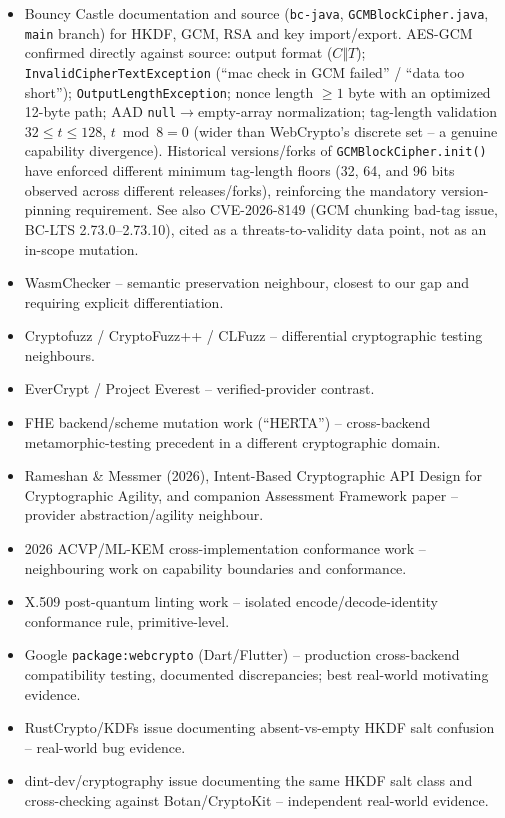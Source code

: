 \documentclass[11pt,a4paper]{article}
\begin{document}
\begin{itemize}
\item Bouncy Castle documentation and source (\texttt{bc-java}, \texttt{GCMBlockCipher.java}, \texttt{main} branch) for HKDF, GCM, RSA and key import/export. AES-GCM confirmed directly against source: output format ($C\Vert T$); \texttt{InvalidCipherTextException} (``mac check in GCM failed'' / ``data too short''); \texttt{OutputLengthException}; nonce length $\ge 1$ byte with an optimized 12-byte path; AAD \texttt{null}$\to$empty-array normalization; tag-length validation $32 \le t \le 128$, $t \bmod 8 = 0$ (wider than WebCrypto's discrete set -- a genuine capability divergence). Historical versions/forks of \texttt{GCMBlockCipher.init()} have enforced different minimum tag-length floors (32, 64, and 96 bits observed across different releases/forks), reinforcing the mandatory version-pinning requirement. See also CVE-2026-8149 (GCM chunking bad-tag issue, BC-LTS 2.73.0--2.73.10), cited as a threats-to-validity data point, not as an in-scope mutation.
\item WasmChecker -- semantic preservation neighbour, closest to our gap and requiring explicit differentiation.
\item Cryptofuzz / CryptoFuzz++ / CLFuzz -- differential cryptographic testing neighbours.
\item EverCrypt / Project Everest -- verified-provider contrast.
\item FHE backend/scheme mutation work (``HERTA'') -- cross-backend metamorphic-testing precedent in a different cryptographic domain.
\item Rameshan \& Messmer (2026), Intent-Based Cryptographic API Design for Cryptographic Agility, and companion Assessment Framework paper -- provider abstraction/agility neighbour.
\item 2026 ACVP/ML-KEM cross-implementation conformance work -- neighbouring work on capability boundaries and conformance.
\item X.509 post-quantum linting work -- isolated encode/decode-identity conformance rule, primitive-level.
\item Google \texttt{package:webcrypto} (Dart/Flutter) -- production cross-backend compatibility testing, documented discrepancies; best real-world motivating evidence.
\item RustCrypto/KDFs issue documenting absent-vs-empty HKDF salt confusion -- real-world bug evidence.
\item dint-dev/cryptography issue documenting the same HKDF salt class and cross-checking against Botan/CryptoKit -- independent real-world evidence.
\end{itemize}
\end{document}
